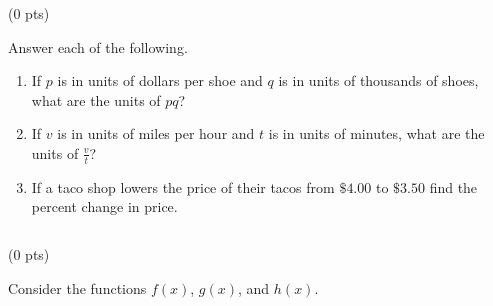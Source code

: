 \documentclass{ximera}
\begin{document}
\newpage $\,$
\newpage


 (0 pts)

Answer each of the following.

\begin{enumerate}[label=(\alph*)]
    \item If $p$ is in units of dollars per shoe and $q$ is in units of thousands of shoes, what are the units of $pq$? \vspace{5cm}
    \item If $v$ is in units of miles per hour and $t$ is in units of minutes, what are the units of $\frac{v}{t}$? \vspace{5cm}
    \item If a taco shop lowers the price of their tacos from $\$4.00$ to $\$3.50$ find the percent change in price. 
\end{enumerate}



\newpage $\,$
\newpage


 (0 pts)

Consider the functions $f(x)$, $g(x)$, and $h(x)$.
\end{document}
